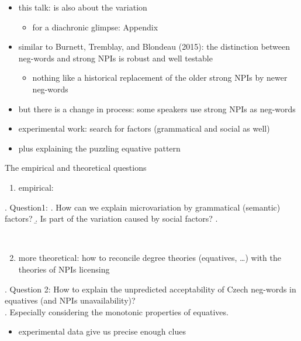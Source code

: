\documentclass[
  ignorenonframetext,
]{beamer}
\providecommand{\tightlist}{%
  \setlength{\itemsep}{0pt}\setlength{\parskip}{0pt}}\usepackage{longtable,booktabs,array}
\begin{document}
\begin{frame}
\begin{itemize}
\tightlist
\item
  this talk: is also about the variation

  \begin{itemize}
  \tightlist
  \item
    for a diachronic glimpse: Appendix
  \end{itemize}
\item
  similar to Burnett, Tremblay, and Blondeau (2015): the distinction
  between neg-words and strong NPIs is robust and well testable

  \begin{itemize}
  \tightlist
  \item
    nothing like a historical replacement of the older strong NPIs by
    newer neg-words
  \end{itemize}
\item
  but there is a change in process: some speakers use strong NPIs as
  neg-words
\item
  experimental work: search for factors (grammatical and social as well)
\item
  plus explaining the puzzling equative pattern
\end{itemize}
\end{frame}

\begin{frame}
\begin{block}{The empirical and theoretical questions}
\protect\hypertarget{the-empirical-and-theoretical-questions}{}
\begin{enumerate}
\tightlist
\item
  empirical:
\end{enumerate}

\ex. Question1: \a. How can we explain microvariation by grammatical
(semantic) factors? \b. Is part of the variation caused by social
factors? \z.

~
\end{block}
\end{frame}

\begin{frame}
\begin{enumerate}
\setcounter{enumi}{1}
\tightlist
\item
  more theoretical: how to reconcile degree theories (equatives, \ldots)
  with the theories of NPIs licensing
\end{enumerate}

\ex. Question 2: How to explain the unpredicted acceptability of Czech
neg-words in equatives (and NPIs unavailability)?\\
\a. Especially considering the monotonic properties of equatives.

\begin{itemize}
\tightlist
\item
  experimental data give us precise enough clues
\end{itemize}
\end{frame}
\end{document}
